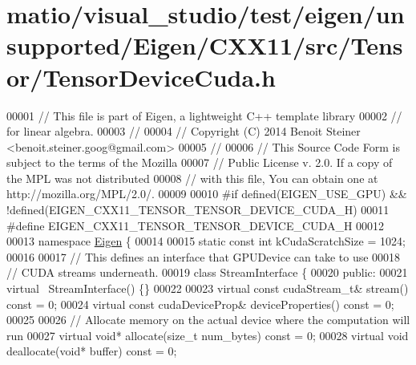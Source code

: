 \hypertarget{matio_2visual__studio_2test_2eigen_2unsupported_2_eigen_2_c_x_x11_2src_2_tensor_2_tensor_device_cuda_8h_source}{}\section{matio/visual\+\_\+studio/test/eigen/unsupported/\+Eigen/\+C\+X\+X11/src/\+Tensor/\+Tensor\+Device\+Cuda.h}
\label{matio_2visual__studio_2test_2eigen_2unsupported_2_eigen_2_c_x_x11_2src_2_tensor_2_tensor_device_cuda_8h_source}

\begin{DoxyCode}
00001 \textcolor{comment}{// This file is part of Eigen, a lightweight C++ template library}
00002 \textcolor{comment}{// for linear algebra.}
00003 \textcolor{comment}{//}
00004 \textcolor{comment}{// Copyright (C) 2014 Benoit Steiner <benoit.steiner.goog@gmail.com>}
00005 \textcolor{comment}{//}
00006 \textcolor{comment}{// This Source Code Form is subject to the terms of the Mozilla}
00007 \textcolor{comment}{// Public License v. 2.0. If a copy of the MPL was not distributed}
00008 \textcolor{comment}{// with this file, You can obtain one at http://mozilla.org/MPL/2.0/.}
00009 
00010 \textcolor{preprocessor}{#if defined(EIGEN\_USE\_GPU) && !defined(EIGEN\_CXX11\_TENSOR\_TENSOR\_DEVICE\_CUDA\_H)}
00011 \textcolor{preprocessor}{#define EIGEN\_CXX11\_TENSOR\_TENSOR\_DEVICE\_CUDA\_H}
00012 
00013 \textcolor{keyword}{namespace }\hyperlink{namespace_eigen}{Eigen} \{
00014 
00015 \textcolor{keyword}{static} \textcolor{keyword}{const} \textcolor{keywordtype}{int} kCudaScratchSize = 1024;
00016 
00017 \textcolor{comment}{// This defines an interface that GPUDevice can take to use}
00018 \textcolor{comment}{// CUDA streams underneath.}
00019 \textcolor{keyword}{class }StreamInterface \{
00020  \textcolor{keyword}{public}:
00021   \textcolor{keyword}{virtual} ~StreamInterface() \{\}
00022 
00023   \textcolor{keyword}{virtual} \textcolor{keyword}{const} cudaStream\_t& stream() \textcolor{keyword}{const} = 0;
00024   \textcolor{keyword}{virtual} \textcolor{keyword}{const} cudaDeviceProp& deviceProperties() \textcolor{keyword}{const} = 0;
00025 
00026   \textcolor{comment}{// Allocate memory on the actual device where the computation will run}
00027   \textcolor{keyword}{virtual} \textcolor{keywordtype}{void}* allocate(\textcolor{keywordtype}{size\_t} num\_bytes) \textcolor{keyword}{const} = 0;
00028   \textcolor{keyword}{virtual} \textcolor{keywordtype}{void} deallocate(\textcolor{keywordtype}{void}* buffer) \textcolor{keyword}{const} = 0;

\end{DoxyCode}
